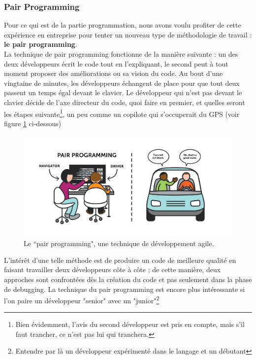 \subsubsection*{Pair Programming}

Pour ce qui est de la partie programmation, nous avons voulu profiter de cette expérience en entreprise pour tenter un nouveau type de méthodologie de travail : \textbf{le pair programming}\cite{PairProgrammingCodementor}.\\

La technique de pair programming fonctionne de la manière suivante : un des deux développeurs écrit le code tout en l'expliquant, le second peut à tout moment proposer des améliorations ou sa vision du code. Au bout d'une vingtaine de minutes, les développeurs échangent de place pour que tout deux passent un temps égal devant le clavier. Le développeur qui n'est pas devant le clavier décide de l'axe directeur du code, quoi faire en premier, et quelles seront les étapes suivante\footnote{Bien évidemment, l'avis du second développeur est pris en compte, mais s'il faut trancher, ce n'est pas lui qui tranchera.}, un peu comme un copilote qui s'occuperait du GPS (voir figure \ref{fig:PairProgramming} ci-dessous)\\


\begin{figure}[h!]
    \centering
    \includegraphics[scale=0.5]{img/pairprog.jpg}
    \caption{Le “pair programming", une technique de développement agile.}
    \label{fig:PairProgramming}
\end{figure}

L'intérêt d'une telle méthode est de produire un code de meilleure qualité en faisant travailler deux développeurs côte à côte ; de cette manière, deux approches sont confrontées dès la création du code et pas seulement dans la phase de debugging. La technique du pair programming est encore plus intéressante si l'on paire un développeur "senior" avec un "junior"\footnote{Entendre par là un développeur expérimenté dans le langage et un débutant}\\

